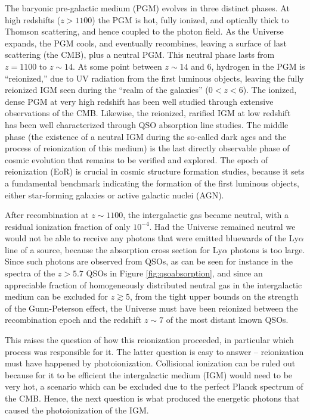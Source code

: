 \documentclass[a4paper,11pt]{article}
\begin{document}
{\noindent}The baryonic pre-galactic medium (PGM) evolves in three distinct phases. At high redshifts ($z>1100$) the PGM is hot, fully ionized, and optically thick to Thomson scattering, and hence coupled to the photon field. As the Universe expands, the PGM cools, and eventually recombines, leaving a surface of last scattering (the CMB), plus a neutral PGM. This neutral phase lasts from $z=1100$ to $z\sim14$. At some point between $z\sim14$ and $6$, hydrogen in the PGM is ``reionized,'' due to UV radiation from the first luminous objects, leaving the fully reionized IGM seen during the ``realm of the galaxies'' ($0<z<6$). The ionized, dense PGM at very high redshift has been well studied through extensive observations of the CMB. Likewise, the reionized, rarified IGM at low redshift has been well characterized through QSO absorption line studies. The middle phase (the existence of a neutral IGM during the so-called dark ages and the process of reionization of this medium) is the last directly observable phase of cosmic evolution that remains to be verified and explored. The epoch of reionization (EoR) is crucial in cosmic structure formation studies, because it sets a fundamental benchmark indicating the formation of the first luminous objects, either star-forming galaxies or active galactic nuclei (AGN).

{\noindent}After recombination at $z\sim1100$, the intergalactic gas became neutral, with a residual ionization fraction of only $10^{-4}$. Had the Universe remained neutral we would not be able to receive any photons that were emitted bluewards of the Ly$\alpha$ line of a source, because the absorption cross section for Ly$\alpha$ photons is too large. Since such photons are observed from QSOs, as can be seen for instance in the spectra of the $z>5.7$ QSOs in Figure \ref{fig:qsoabsorption}, and since an appreciable fraction of homogeneously distributed neutral gas in the intergalactic medium can be excluded for $z\gtrsim5$, from the tight upper bounds on the strength of the Gunn-Peterson effect, the Universe must have been reionized between the recombination epoch and the redshift $z\sim7$ of the most distant known QSOs.

{\noindent}This raises the question of how this reionization proceeded, in particular which process was responsible for it. The latter question is easy to answer -- reionization must have happened by photoionization. Collisional ionization can be ruled out because for it to be efficient the intergalactic medium (IGM) would need to be very hot, a scenario which can be excluded due to the perfect Planck spectrum of the CMB. Hence, the next question is what produced the energetic photons that caused the photoionization of the IGM.
\end{document}
